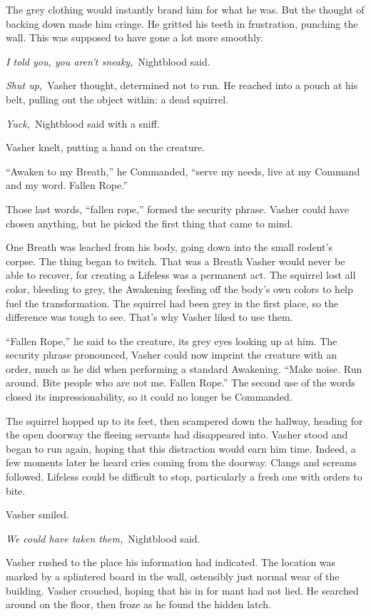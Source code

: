 The grey clothing would instantly brand him for what he was. But the thought of backing down made him cringe. He gritted his teeth in frustration, punching the wall. This was supposed to have gone a lot more smoothly.

\textit{I told you, you aren’t sneaky,}~Nightblood said.

\textit{Shut up,}~Vasher thought, determined not to run. He reached into a pouch at his belt, pulling out the object within: a dead squirrel.

\textit{Yuck,}~Nightblood said with a sniff.

Vasher knelt, putting a hand on the creature.

“Awaken to my Breath,” he Commanded, “serve my needs, live at my Command and my word. Fallen Rope.”

Those last words, “fallen rope,” formed the security phrase. Vasher could have chosen anything, but he picked the first thing that came to mind.

One Breath was leached from his body, going down into the small rodent’s corpse. The thing began to twitch. That was a Breath Vasher would never be able to recover, for creating a Lifeless was a permanent act. The squirrel lost all color, bleeding to grey, the Awakening feeding off the body’s own colors to help fuel the transformation. The squirrel had been grey in the first place, so the difference was tough to see. That’s why Vasher liked to use them.

“Fallen Rope,” he said to the creature, its grey eyes looking up at him. The security phrase pronounced, Vasher could now imprint the creature with an order, much as he did when performing a standard Awakening. “Make noise. Run around. Bite people who are not me. Fallen Rope.” The second use of the words closed its impressionability, so it could no longer be Commanded.

The squirrel hopped up to its feet, then scampered down the hallway, heading for the open doorway the fleeing servants had disappeared into. Vasher stood and began to run again, hoping that this distraction would earn him time. Indeed, a few moments later he heard cries coming from the doorway. Clangs and screams followed. Lifeless could be difficult to stop, particularly a fresh one with orders to bite.

Vasher smiled.

\textit{We could have taken them,}~Nightblood said.

Vasher rushed to the place his information had indicated. The location was marked by a splintered board in the wall, ostensibly just normal wear of the building. Vasher crouched, hoping that his in for mant had not lied. He searched around on the floor, then froze as he found the hidden latch.

